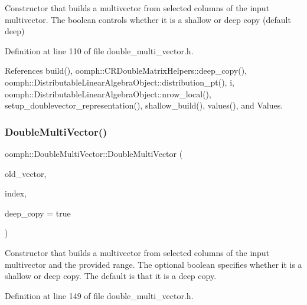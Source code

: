 Constructor that builds a multivector from selected columns of the input multivector. The boolean controls whether it is a shallow or deep copy (default deep) 



Definition at line 110 of file double\+\_\+multi\+\_\+vector.\+h.



References build(), oomph\+::\+C\+R\+Double\+Matrix\+Helpers\+::deep\+\_\+copy(), oomph\+::\+Distributable\+Linear\+Algebra\+Object\+::distribution\+\_\+pt(), i, oomph\+::\+Distributable\+Linear\+Algebra\+Object\+::nrow\+\_\+local(), setup\+\_\+doublevector\+\_\+representation(), shallow\+\_\+build(), values(), and Values.

\mbox{\label{classoomph_1_1DoubleMultiVector_a7dec1c0b074c260ee22207cdfed20eca}} 
\subsubsection{\texorpdfstring{Double\+Multi\+Vector()}{DoubleMultiVector()}\hspace{0.1cm}{\footnotesize\ttfamily [6/7]}}
{\footnotesize\ttfamily oomph\+::\+Double\+Multi\+Vector\+::\+Double\+Multi\+Vector (\begin{DoxyParamCaption}\item[{const \hyperlink{classoomph_1_1DoubleMultiVector}{Double\+Multi\+Vector} \&}]{old\+\_\+vector,  }\item[{const Teuchos\+::\+Range1D \&}]{index,  }\item[{const bool \&}]{deep\+\_\+copy = {\ttfamily true} }\end{DoxyParamCaption})\hspace{0.3cm}{\ttfamily [inline]}}



Constructor that builds a multivector from selected columns of the input multivector and the provided range. The optional boolean specifies whether it is a shallow or deep copy. The default is that it is a deep copy. 



Definition at line 149 of file double\+\_\+multi\+\_\+vector.\+h.



